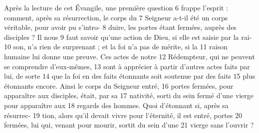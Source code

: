 Après la lecture de cet Évangile, une première question	 
6	 	frappe l'esprit : comment, après sa résurrection, le corps du	 
7	 	Seigneur a-t-il été un corps véritable, pour avoir pu s'intro-	 
8	 	duire, les portes étant fermées, auprès des disciples ? Il nous	 
9	 	faut savoir qu'une action de Dieu, si elle est saisie par la rai-	 
10	 	son, n'a rien de surprenant ; et la foi n'a pas de mérite, si la	 
11	 	raison humaine lui donne une preuve. Ces actes de notre	 
12	 	Rédempteur, qui ne peuvent se comprendre d'eux-mêmes,	 
13	 	sont à apprécier à partir d'autres actes faits par lui, de sorte	 
14	 	que la foi en des faits étonnants soit soutenue par des faits	 
15	 	plus étonnants encore. Ainsi le corps du Seigneur entré,	 
16	 	portes fermées, pour apparaître aux disciples, était, par sa	 
17	 	nativité, sorti du sein fermé d'une vierge pour apparaître aux	 
18	 	regards des hommes. Quoi d'étonnant si, après sa résurrec-	 
19	 	tion, alors qu'il devait vivre pour l'éternité, il est entré, portes	 
20	 	fermées, lui qui, venant pour mourir, sortit du sein d'une	 
21	 	vierge sans l'ouvrir ?